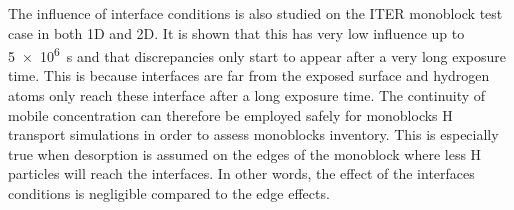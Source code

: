 The influence of interface conditions is also studied on the ITER monoblock test case in both 1D and 2D.
It is shown that this has very low influence up to \SI{5e6}{s} and that discrepancies only start to appear after a very long exposure time.
This is because interfaces are far from the exposed surface and hydrogen atoms only reach these interface after a long exposure time.
The continuity of mobile concentration can therefore be employed safely for monoblocks H transport simulations in order to assess monoblocks inventory.
This is especially true when desorption is assumed on the edges of the monoblock where less H particles will reach the interfaces.
In other words, the effect of the interfaces conditions is negligible compared to the edge effects.
